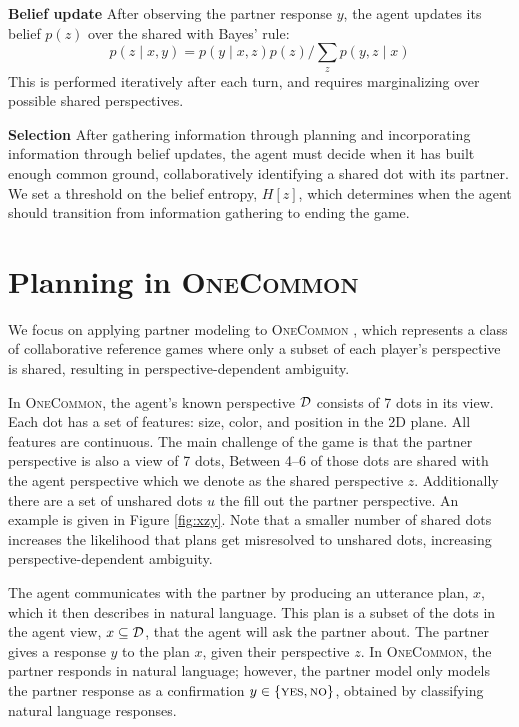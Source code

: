 \documentclass[11pt]{article}
\newcommand{\daniel}[1]{{{\textcolor{red}{(Daniel: #1)}}}}
\begin{document}

\noindent \textbf{Belief update}
After observing the partner response $y$, the agent updates its belief $p(z)$ over the shared
with Bayes' rule:
$$p(z \mid x, y) = p(y \mid x,z)p(z) / \sum_z p(y,z \mid x)$$
This is performed iteratively after each turn,
and requires marginalizing over possible shared perspectives.

\noindent \textbf{Selection}
After gathering information through planning and
incorporating information through belief updates,
the agent must decide when it has built enough common ground, collaboratively identifying a shared dot with its partner.
We set a threshold on the belief entropy, $H[z]$,
which determines when the agent should transition
from information gathering to ending the game.

\section{Planning in \textsc{OneCommon}}
\label{sec:plan-oc}

We focus on applying partner modeling to \textsc{OneCommon} \citep{onecommon}, which represents a class of collaborative reference games \citep{mf,pb} where only a subset of each player's perspective is shared, resulting in perspective-dependent ambiguity. 

In \textsc{OneCommon}, the agent's known perspective $\mathcal{D}$ consists
of 7 dots in its view.
Each dot has a set of features: size, color, and position in the 2D plane.
All features are continuous.
The main challenge of the game is that the partner perspective is also a view of 7 dots,
Between 4--6 of those dots are shared with the agent
perspective which we denote as the shared perspective $z$.
Additionally there are a set of unshared dots $u$ the fill out the partner perspective.
An example is given in Figure \ref{fig:xzy}.
Note that a smaller number of shared dots increases the likelihood that plans get misresolved to unshared dots, increasing perspective-dependent ambiguity.

The agent communicates with the partner by producing an utterance plan, $x$, which it then describes in natural language.
This plan is a subset of the dots in the agent view, $x \subseteq\mathcal{D}$,
that the agent will ask the partner about. The partner gives a response $y$ to the plan $x$, given their perspective $z$.
In \textsc{OneCommon}, the partner responds in natural language;
however, the partner model only models the partner response as a confirmation $y\in\left\{\textsc{yes}, \textsc{no}\right\}$,
obtained by classifying natural language responses.
\end{document}
